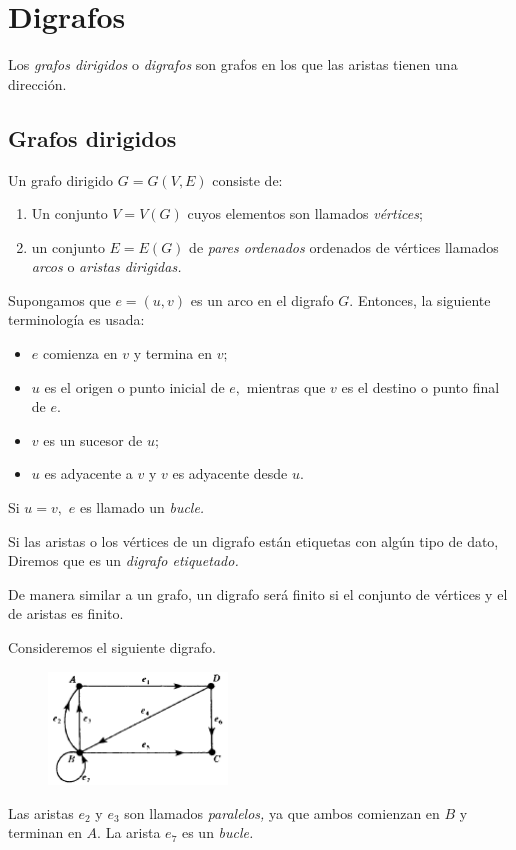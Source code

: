 \section{Digrafos}


Los \emph{grafos dirigidos} o \emph{digrafos} son grafos en los que las aristas tienen una dirección.


\subsection{Grafos dirigidos}


Un grafo dirigido $G=G(V,E)$ consiste de:
\begin{enumerate}
	\item Un conjunto $V=V(G)$ cuyos elementos son llamados \emph{v\'ertices};
	\item un conjunto $E=E(G)$ de \emph{pares ordenados} ordenados de v\'ertices llamados \emph{arcos} o \emph{aristas dirigidas.}
\end{enumerate}




Supongamos que $e=(u,v)$ es un arco en el digrafo $G.$ Entonces, la siguiente terminología es usada:
\begin{itemize}
	\item $e$ comienza en $v$ y termina en $v;$
	\item $u$ es el origen o punto inicial de $e,$ mientras que $v$ es el destino o punto final de $e.$
	\item $v$ es un sucesor de $u;$
	\item $u$ es adyacente a $v$ y $v$ es adyacente desde $u.$
\end{itemize}


Si $u=v,$ $e$ es llamado un \emph{bucle.}



Si las aristas o los v\'ertices de un digrafo están etiquetas con algún tipo de dato, Diremos que es un \emph{digrafo etiquetado.}


De manera similar a un grafo, un digrafo será finito si el conjunto de v\'ertices y el de aristas es finito.



\begin{problema}
	Consideremos el siguiente digrafo.
	\begin{figure}
		\centering
		\includegraphics[height=3cm,keepaspectratio=true]{./md/fig0901a.png}
		\label{fig:0901a}
	\end{figure}
	Las aristas $e_{2}$ y $e_{3}$ son llamados \emph{paralelos,} ya que ambos comienzan en $B$ y terminan en $A.$ La arista $e_{7}$ es un \emph{bucle.}
\end{problema}




